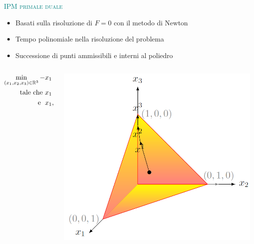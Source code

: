 \begin{frame}{\textcolor{teal}{\textsc{\LARGE IPM primale duale}}}
	\begin{itemize}
		\item Basati sulla risoluzione di $\mathit{F}= 0$ con il metodo di Newton
		\item Tempo polinomiale nella risoluzione del problema
		\item Successione di punti ammissibili e interni al poliedro
	\end{itemize}
\pause
\begin{columns}
	\begin{column}{0.4\textwidth}
		\begin{align*}
		\min\limits_{(x_{1},x_{2},x_{3})\in\mathbb{R}^{3}} -&x_{1}+ x_{2}-4x_{3}\\
		\text{tale che    }&x_{1}+x_{2}+x_{3}=1,\\
		\text{\; e   \;} &x_{1}, x_{2}, x_{3} \geq 0
		\end{align*}
	\end{column}
	\pause
	\begin{column}{0.4\textwidth}
		\includegraphics[width=\columnwidth]{Feas2.jpg}
	\end{column}
\end{columns}
\end{frame}


\begin{frame}
	
\end{frame}

